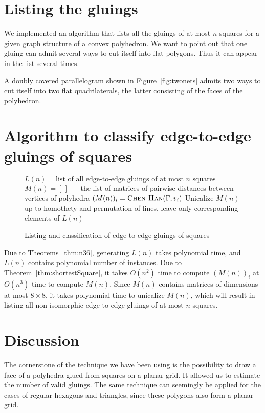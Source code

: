 \documentclass[a4paper,USenglish,cleveref, autoref, thm-restate]{socg-lipics-v2019}
\begin{document}
\section{Listing the gluings}

We implemented an algorithm that lists all the gluings of at most $n$ squares for a given graph structure of a convex polyhedron. We want to point out that one gluing can admit several ways to cut itself into flat polygons. Thus it can appear in the list several times.



\begin{example}
	A doubly covered parallelogram shown in Figure~\ref{fig:twonets} admits two ways to cut itself into two flat quadrilaterals, the latter consisting of the faces of the polyhedron.
\end{example}

\section{Algorithm to classify edge-to-edge gluings of squares}

\begin{figure}[h]
\begin{algorithmic}[1]
	\State $L(n) = \text{list of all edge-to-edge gluings of at most $n$ squares}$
	\State $M(n) = [\,]$ — the list of matrices of pairwise distances between vertices of polyhedra
		\State $(M(n))_i = \text{\scshape Chen-Han} (\Gamma,v_i)$
	    \EndFor
	\EndFor
	\State Unicalize $M(n)$ up to homothety and permutation of lines, leave only corresponding elements of $L(n)$
\end{algorithmic}
	\caption{Listing and classification of edge-to-edge gluings of squares}
	\label{fig:alglistall}
\end{figure}

Due to Theorems~\ref{thm:n36}, generating $L(n)$ takes polynomial time, and $L(n)$ contains polynomial number of instances. Due to Theorem~\ref{thm:shortestSquare}, it takes $O(n^2)$ time to compute $(M(n))_i$ at $O(n^3)$ time to compute $M(n)$. Since $M(n)$ contains matrices of dimensions at most $8 \times 8$, it takes polynomial time to unicalize $M(n)$, which will result in listing all non-isomorphic edge-to-edge gluings of at most $n$ squares.

\section{Discussion}

The cornerstone of the technique we have been using is the possibility to draw a face of a polyhedra glued from squares on a planar grid. It allowed us to estimate the number of valid gluings. The same technique can seemingly be applied for the cases of regular hexagons and triangles, since these polygons also form a planar grid.


\end{document}
